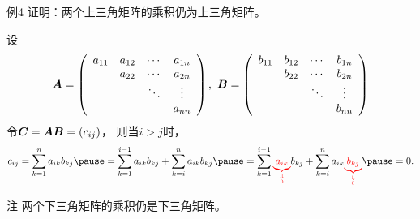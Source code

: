 \begin{frame}
  \begin{footnotesize}
    \begin{exampleblock}{例4}
      证明：两个上三角矩阵的乘积仍为上三角矩阵。
    \end{exampleblock}
    \proofname
    设
    $$
    \boldsymbol{A} = \left(
      \begin{array}{cccc}
        a_{11} & a_{12} & \cdots & a_{1n} \\
               & a_{22} & \cdots & a_{2n} \\
               &       & \ddots & \vdots   \\
               &       &     & a_{nn}
      \end{array}
    \right), ~     \boldsymbol{B} = \left(
      \begin{array}{cccc}
        b_{11} & b_{12} & \cdots & b_{1n} \\
               & b_{22} & \cdots & b_{2n} \\
               &       & \ddots & \vdots   \\
               &       &     & b_{nn}
      \end{array}
    \right)
    $$
    \pause 
    令$\boldsymbol{C} = \boldsymbol{A}\boldsymbol{B} = (c_{ij})$，
    则当$i>j$时，
    $$
    c_{ij} = \sum_{k=1}^n a_{ik}b_{kj}  \pause 
    = \sum_{k=1}^{i-1} a_{ik}b_{kj}  + \sum_{k=i}^n a_{ik}b_{kj} \pause 
    = \sum_{k=1}^{i-1} \red{\underbrace{a_{ik}}_{\Downarrow\atop0}}b_{kj}  
    + \sum_{k=i}^n a_{ik}\red{\underbrace{b_{kj}}_{\Downarrow\atop0}} \pause = 0.
    $$
    \pause 
    \begin{block}{注}
      两个下三角矩阵的乘积仍是下三角矩阵。
    \end{block}
  \end{footnotesize}
\end{frame}


